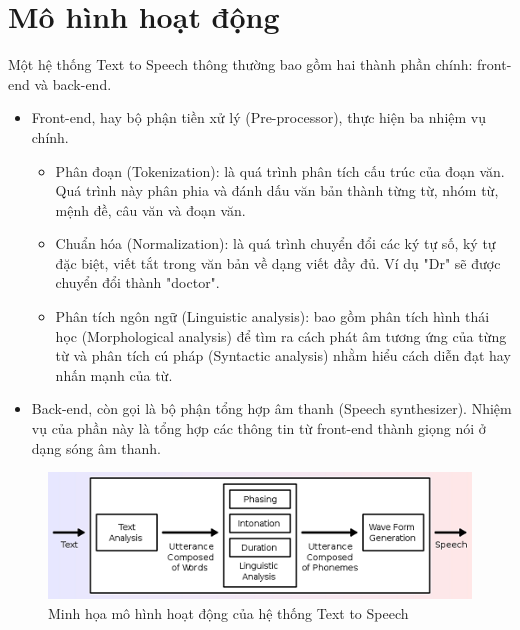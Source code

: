\section{Mô hình hoạt động}
Một hệ thống Text to Speech thông thường bao gồm hai thành phần chính: front-end và back-end.
\begin{itemize}
\item Front-end, hay bộ phận tiền xử lý (Pre-processor), thực hiện ba nhiệm vụ chính. 
	\begin{itemize}
		\item Phân đoạn (Tokenization): là quá trình phân tích cấu trúc của đoạn văn. Quá trình này phân phia và đánh dấu văn bản thành từng từ, nhóm từ, mệnh đề, câu văn và đoạn văn.
		\item Chuẩn hóa (Normalization): là quá trình chuyển đổi các ký tự số, ký tự đặc biệt, viết tắt trong văn bản về dạng viết đầy đủ. Ví dụ "Dr"  sẽ được chuyển đổi thành "doctor". 
		\item Phân tích ngôn ngữ (Linguistic analysis): bao gồm phân tích hình thái học (Morphological analysis) để tìm ra cách phát âm tương ứng của từng từ và phân tích cú pháp (Syntactic analysis) nhằm hiểu cách diễn đạt hay nhấn mạnh của từ.
	\end{itemize}
\item Back-end, còn gọi là bộ phận tổng hợp âm thanh (Speech synthesizer). Nhiệm vụ của phần này là tổng hợp các thông tin từ front-end thành giọng nói ở dạng sóng âm thanh.
\end{itemize}
\begin{figure}[h]
    \centering
    \includegraphics[scale=1]{ttsmodel}
    \caption{Minh họa mô hình hoạt động của hệ thống Text to Speech}
    \label{fig:c4_ttsmodel}
\end{figure}

